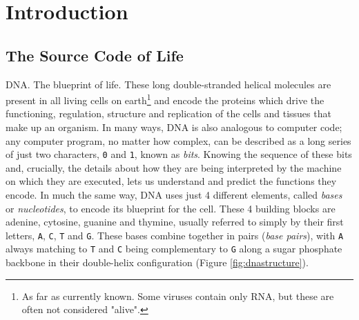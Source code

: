 \chapter{Introduction}
\label{introduction}
\setcounter{figure}{-1}
\setcounter{table}{-1}
\setcounter{section}{-1}
\setcounter{NAT@ctr}{-1}

\setlength\parindent{0pt}

\section{The Source Code of Life}

DNA. The blueprint of life. These long double-stranded helical molecules are present in all living cells on earth\footnote{As far as currently known. Some viruses contain only RNA, but these are often not considered "alive".} and encode the proteins which drive the functioning, regulation, structure and replication of the cells and tissues that make up an organism. In many ways, DNA is also analogous to computer code; any computer program, no matter how complex, can be described as a long series of just two characters, \verb+0+ and \verb+1+, known as \emph{bits}. Knowing the sequence of these bits and, crucially, the details about how they are being interpreted by the machine on which they are executed, lets us understand and predict the functions they encode. In much the same way, DNA uses just 4 different elements, called \emph{bases} or \emph{nucleotides}, to encode its blueprint for the cell. These 4 building blocks are adenine, cytosine, guanine and thymine, usually referred to simply by their first letters, \verb+A+, \verb+C+, \verb+T+ and \verb+G+. These bases combine together in pairs (\emph{base pairs}), with \verb+A+ always matching to \verb+T+ and \verb+C+ being complementary to \verb+G+ along a sugar phosphate backbone in their double-helix configuration (Figure \ref{fig:dnastructure}).

